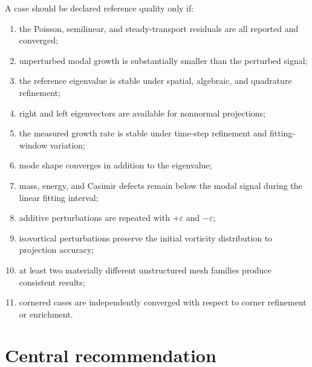\documentclass[11pt,a4paper]{article}
\begin{document}
A case should be declared reference quality only if:
\begin{enumerate}
  \item the Poisson, semilinear, and steady-transport residuals are all reported and converged;
  \item unperturbed modal growth is substantially smaller than the perturbed signal;
  \item the reference eigenvalue is stable under spatial, algebraic, and quadrature refinement;
  \item right and left eigenvectors are available for nonnormal projections;
  \item the measured growth rate is stable under time-step refinement and fitting-window variation;
  \item mode shape converges in addition to the eigenvalue;
  \item mass, energy, and Casimir defects remain below the modal signal during the linear fitting interval;
  \item additive perturbations are repeated with $+\varepsilon$ and $-\varepsilon$;
  \item isovortical perturbations preserve the initial vorticity distribution to projection accuracy;
  \item at least two materially different unstructured mesh families produce consistent results;
  \item cornered cases are independently converged with respect to corner refinement or enrichment.
\end{enumerate}

\section{Central recommendation}
\end{document}
